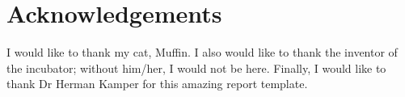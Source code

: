 \chapter*{Acknowledgements}
\makeatletter{}\makeatother
    I would like to thank my cat, Muffin. I also would like to thank the inventor of the incubator; without him/her, I would not be here. Finally, I would like to thank Dr Herman Kamper for this amazing report template.

